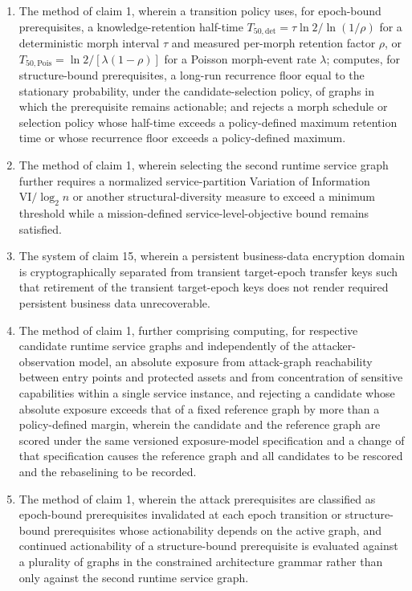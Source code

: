 \documentclass[11pt,letterpaper]{article}
\begin{document}
\begin{enumerate}[leftmargin=2em,itemsep=3pt,label=\arabic*.]
\item The method of claim 1, wherein a transition policy uses, for epoch-bound prerequisites, a knowledge-retention half-time $T_{50,\mathrm{det}}=\tau\ln 2/\ln(1/\rho)$ for a deterministic morph interval $\tau$ and measured per-morph retention factor $\rho$, or $T_{50,\mathrm{Pois}}=\ln 2/[\lambda(1-\rho)]$ for a Poisson morph-event rate $\lambda$; computes, for structure-bound prerequisites, a long-run recurrence floor equal to the stationary probability, under the candidate-selection policy, of graphs in which the prerequisite remains actionable; and rejects a morph schedule or selection policy whose half-time exceeds a policy-defined maximum retention time or whose recurrence floor exceeds a policy-defined maximum.
\item The method of claim 1, wherein selecting the second runtime service graph further requires a normalized service-partition Variation of Information $\mathrm{VI}/\log_2 n$ or another structural-diversity measure to exceed a minimum threshold while a mission-defined service-level-objective bound remains satisfied.
\item The system of claim 15, wherein a persistent business-data encryption domain is cryptographically separated from transient target-epoch transfer keys such that retirement of the transient target-epoch keys does not render required persistent business data unrecoverable.
\item The method of claim 1, further comprising computing, for respective candidate runtime service graphs and independently of the attacker-observation model, an absolute exposure from attack-graph reachability between entry points and protected assets and from concentration of sensitive capabilities within a single service instance, and rejecting a candidate whose absolute exposure exceeds that of a fixed reference graph by more than a policy-defined margin, wherein the candidate and the reference graph are scored under the same versioned exposure-model specification and a change of that specification causes the reference graph and all candidates to be rescored and the rebaselining to be recorded.
\item The method of claim 1, wherein the attack prerequisites are classified as epoch-bound prerequisites invalidated at each epoch transition or structure-bound prerequisites whose actionability depends on the active graph, and continued actionability of a structure-bound prerequisite is evaluated against a plurality of graphs in the constrained architecture grammar rather than only against the second runtime service graph.

\end{enumerate}
\end{document}
